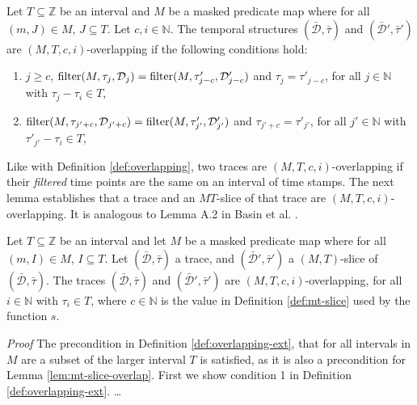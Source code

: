 \begin{definition}
    \label{def:overlapping-ext}
    Let $T \subseteq \mathbb{Z}$ be an interval and $M$ be a masked predicate map where for all $(m, J) \in M$, $J \subseteq T$.
    Let $c,i \in \mathbb{N}$.
    The temporal structures $(\bar{\mathcal{D}}, \bar{\tau})$ and $(\bar{\mathcal{D}}', \bar{\tau}')$ are $(M,T,c,i)$-overlapping if the following conditions hold:
    \renewcommand{\labelenumi}{\arabic{enumi}.}
    \begin{enumerate}
        \item $j \geq c$, $\operatorname{filter}(M, \tau_j, \mathcal{D}_j)=\operatorname{filter}(M, \tau'_{j-c}, \mathcal{D}'_{j-c})$ and $\tau_j = \tau'_{j-c}$, for all $j \in \mathbb{N}$ with $\tau_j - \tau_i \in T$,
        \item $\operatorname{filter}(M, \tau_{j' + c}, \mathcal{D}_{j' + c})=\operatorname{filter}(M, \tau'_{j'}, \mathcal{D}'_{j'})$ and $\tau_{j' + c} = \tau'_{j'}$, for all $j' \in \mathbb{N}$ with $\tau'_{j'} - \tau_i \in T$,
    \end{enumerate}
\end{definition}
Like with Definition \ref{def:overlapping}, two traces are $(M,T,c,i)$-overlapping if their \textit{filtered} time points are the same on an interval of time stamps.
The next lemma establishes that a trace and an $MT$-slice of that trace are $(M,T,c,i)$-overlapping.
It is analogous to Lemma A.2 in Basin et al. \cite{Basin2016}.
\begin{lemma}
    \label{lem:mt-slice-overlap}
    Let $T \subseteq \mathbb{Z}$ be an interval and let $M$ be a masked predicate map where for all $(m,I) \in M$, $I \subseteq T$.
    Let $(\bar{\mathcal{D}}, \bar{\tau})$ a trace, and $(\bar{\mathcal{D}}', \bar{\tau}')$ a $(M, T)$-slice of $(\bar{\mathcal{D}}, \bar{\tau})$.
    The traces $(\bar{\mathcal{D}}, \bar{\tau})$ and $(\bar{\mathcal{D}}', \bar{\tau}')$ are $(M,T,c,i)$-overlapping, for all $i \in \mathbb{N}$ with $\tau_i \in T$, where $c \in \mathbb{N}$ is the value in Definition \ref{def:mt-slice} used by the function $s$.
\end{lemma}
\textit{Proof}
The precondition in Definition \ref{def:overlapping-ext}, that for all intervals in $M$ are a subset of the larger interval $T$ is satisfied, as it is also a precondition for Lemma \ref{lem:mt-slice-overlap}.
First we show condition 1 in Definition \ref{def:overlapping-ext}.
\dots


